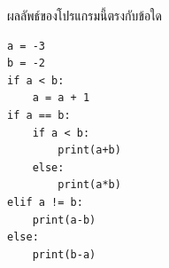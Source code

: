 \question ผลลัพธ์ของโปรแกรมนี้ตรงกับข้อใด
\begin{verbatim}
a = -3
b = -2
if a < b:
    a = a + 1
if a == b:
    if a < b:
        print(a+b)
    else:
        print(a*b)
elif a != b:
    print(a-b)
else:
    print(b-a)
\end{verbatim}

